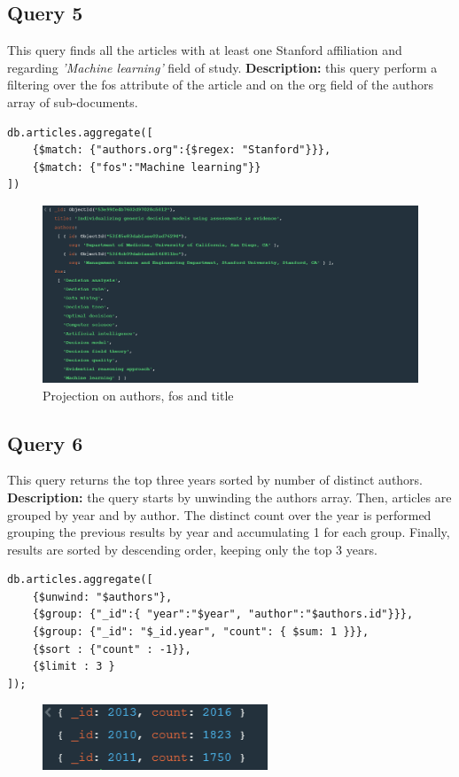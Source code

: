 \documentclass{Configuration_Files/PoliMi3i_thesis}
\begin{document}
\subsection{Query 5}
This query finds all the articles with at least one Stanford affiliation and regarding \emph{'Machine learning'} field
of study. \newline
\textbf{Description:} this query perform a filtering over the fos attribute of the article and on the org field of the
authors array of sub-documents.
\begin{lstlisting}
db.articles.aggregate([
	{$match: {"authors.org":{$regex: "Stanford"}}},
	{$match: {"fos":"Machine learning"}}
])
\end{lstlisting}
\begin{figure}[H]
\centering
\includegraphics[width=1\textwidth]{query/mongo_q5.PNG}
\caption{Projection on authors, fos and title}
\label{fig:query5}
\end{figure}

\subsection{Query 6}
This query returns the top three years sorted by number of distinct authors.\newline
\textbf{Description:} the query starts by unwinding the authors array. Then, articles are grouped by year and by
author. The distinct count over the year is performed grouping the previous results by year and accumulating 1 for
each group. Finally, results are sorted by descending order, keeping only the top 3 years.
\begin{lstlisting}
db.articles.aggregate([
	{$unwind: "$authors"},
	{$group: {"_id":{ "year":"$year", "author":"$authors.id"}}},
	{$group: {"_id": "$_id.year", "count": { $sum: 1 }}},
	{$sort : {"count" : -1}},
	{$limit : 3 }
]);
\end{lstlisting}
\begin{figure}[H]
\centering
\includegraphics[width=0.6\textwidth]{query/mongo_q6.PNG}
\label{fig:query6}
\end{figure}
\end{document}
